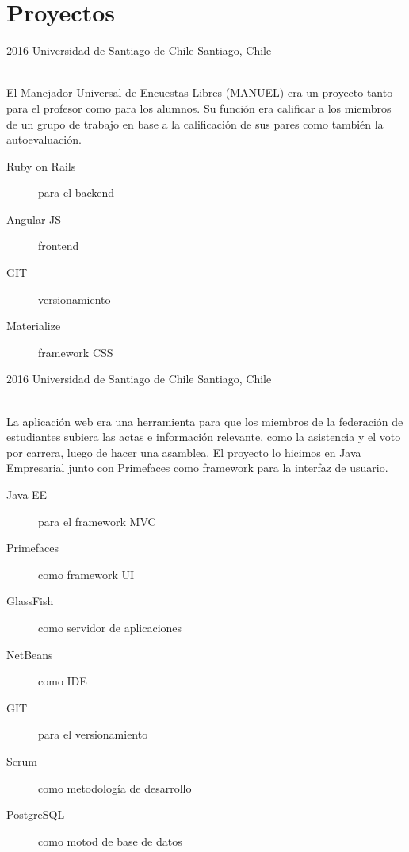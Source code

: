 
\section{Proyectos}

\begin{entrylist}
  \entry
  {2016}
  {Universidad de Santiago de Chile}
  {Santiago, Chile}
  {\\
  El Manejador Universal de Encuestas Libres (MANUEL) era un proyecto tanto 
  para el profesor como para los alumnos. Su función era calificar a los 
  miembros de un grupo de trabajo en base a la calificación de sus pares como 
  también la autoevaluación.\\
  \begin{description}
    \item[Ruby on Rails] para el backend
    \item[Angular JS] frontend
    \item[GIT] versionamiento
    \item[Materialize] framework CSS
  \end{description}
  }

  \entry
  {2016}
  {Universidad de Santiago de Chile}
  {Santiago, Chile}
  {\\
  La aplicación web era una herramienta para que los miembros de la federación 
  de estudiantes subiera las actas e información relevante, como la asistencia 
  y el voto por carrera, luego de hacer una asamblea. El proyecto lo hicimos 
  en Java Empresarial junto con Primefaces como framework para la interfaz de 
  usuario.\\
  \begin{description}
    \item[Java EE] para el framework MVC
    \item[Primefaces] como framework UI
    \item[GlassFish] como servidor de aplicaciones
    \item[NetBeans] como IDE
    \item[GIT] para el versionamiento
    \item[Scrum] como metodología de desarrollo
    \item[PostgreSQL] como motod de base de datos
  \end{description}}


\end{entrylist}
